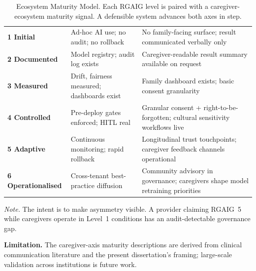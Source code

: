 {\tablestripes\tablefontsize
{}
\begin{xltabular}{\textwidth}{@{} >{\centering\arraybackslash}p{1.4cm} L L @{}}
\caption[Ecosystem Maturity Model]{Ecosystem Maturity Model. Each RGAIG level is paired with a caregiver-ecosystem maturity signal. A defensible system advances both axes in step.}\label{tab:appj_maturity} \\
\toprule
{} &  &  \\
\midrule
\endfirsthead
\endhead
\bottomrule
\endlastfoot
\textbf{1 Initial}        & Ad-hoc AI use; no audit; no rollback                       & No family-facing surface; result communicated verbally only \\
\textbf{2 Documented}     & Model registry; audit log exists                            & Caregiver-readable result summary available on request \\
\textbf{3 Measured}       & Drift, fairness measured; dashboards exist                  & Family dashboard exists; basic consent granularity \\
\textbf{4 Controlled}     & Pre-deploy gates enforced; HITL real                        & Granular consent + right-to-be-forgotten; cultural sensitivity workflows live \\
\textbf{5 Adaptive}       & Continuous monitoring; rapid rollback                       & Longitudinal trust touchpoints; caregiver feedback channels operational \\
\textbf{6 Operationalised} & Cross-tenant best-practice diffusion                        & Community advisory in governance; caregivers shape model retraining priorities \\
\end{xltabular}}
\vspace{0.4em}
\noindent\textit{Note.} The intent is to make asymmetry visible. A provider claiming RGAIG~5 while caregivers operate in Level~1 conditions has an audit-detectable governance gap.

\noindent\textbf{Limitation.} The caregiver-axis maturity descriptions are derived from clinical communication literature and the present dissertation's framing; large-scale validation across institutions is future work.

